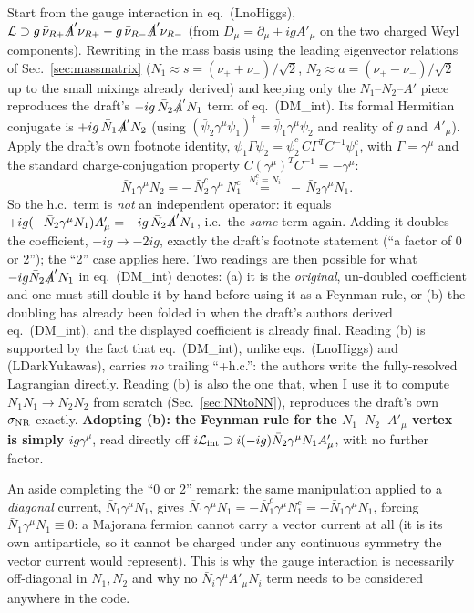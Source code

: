 \documentclass[11pt,a4paper]{article}
\begin{document}
Start from the gauge interaction in eq.~(LnoHiggs),
$\mathcal L\supset g\,\bar\nu_{R+}\slashed A'\nu_{R+}-g\,\bar\nu_{R-}\slashed A'\nu_{R-}$
(from $D_\mu=\partial_\mu\pm ig A'_\mu$ on the two charged Weyl components).
Rewriting in the mass basis using the leading eigenvector relations of
Sec.~\ref{sec:massmatrix} ($N_1\approx s=(\nu_++\nu_-)/\sqrt2$,
$N_2\approx a=(\nu_+-\nu_-)/\sqrt2$ up to the small mixings already derived)
and keeping only the $N_1$--$N_2$--$A'$ piece reproduces the draft's
$-ig\,\bar N_2\slashed A' N_1$ term of eq.~(DM\_int). Its formal Hermitian
conjugate is $+ig\,\bar N_1\slashed A' N_2$ (using
$(\bar\psi_2\gamma^\mu\psi_1)^\dagger=\bar\psi_1\gamma^\mu\psi_2$ and reality
of $g$ and $A'_\mu$). Apply the draft's own footnote identity,
$\bar\psi_1\Gamma\psi_2=\bar\psi_2^c\,C\Gamma^TC^{-1}\psi_1^c$, with
$\Gamma=\gamma^\mu$ and the standard charge-conjugation property
$C(\gamma^\mu)^TC^{-1}=-\gamma^\mu$:
\begin{equation}
  \bar N_1\gamma^\mu N_2 = -\,\bar N_2^c\,\gamma^\mu\,N_1^c
  \;\overset{N_i^c=N_i}{=}\; -\,\bar N_2\gamma^\mu N_1 .
\end{equation}
So the h.c.\ term is \emph{not} an independent operator: it equals
$+ig(-\bar N_2\gamma^\mu N_1)A'_\mu=-ig\,\bar N_2\slashed A' N_1$, i.e.\ the
\emph{same} term again. Adding it doubles the coefficient,
$-ig\to-2ig$, exactly the draft's footnote statement (``a factor of 0 or
2''); the ``2'' case applies here. Two readings are then possible for what
$-ig\bar N_2\slashed A'N_1$ in eq.~(DM\_int) denotes: (a) it is the
\emph{original}, un-doubled coefficient and one must still double it by hand
before using it as a Feynman rule, or (b) the doubling has already been
folded in when the draft's authors derived eq.~(DM\_int), and the displayed
coefficient is already final. Reading (b) is supported by the fact that
eq.~(DM\_int), unlike eqs.~(LnoHiggs) and (LDarkYukawas), carries \emph{no}
trailing ``+h.c.'': the authors write the fully-resolved Lagrangian directly.
Reading (b) is also the one that, when I use it to compute
$N_1N_1\to N_2N_2$ from scratch (Sec.~\ref{sec:NNtoNN}), reproduces the
draft's own $\sigma_{\rm NR}$ exactly. \textbf{Adopting (b): the Feynman rule
for the $N_1$--$N_2$--$A'_\mu$ vertex is simply $ig\gamma^\mu$}, read directly
off $i\mathcal L_{\rm int}\supset i(-ig)\bar N_2\gamma^\mu N_1A'_\mu$, with no
further factor.

An aside completing the ``0 or 2'' remark: the same manipulation applied to
a \emph{diagonal} current, $\bar N_1\gamma^\mu N_1$, gives
$\bar N_1\gamma^\mu N_1=-\bar N_1^c\gamma^\mu N_1^c=-\bar N_1\gamma^\mu N_1$,
forcing $\bar N_1\gamma^\mu N_1\equiv0$: a Majorana fermion cannot carry a
vector current at all (it is its own antiparticle, so it cannot be charged
under any continuous symmetry the vector current would represent). This is
why the gauge interaction is necessarily off-diagonal in $N_1,N_2$ and why no
$\bar N_i\gamma^\mu A'_\mu N_i$ term needs to be considered anywhere in the
code.
\end{document}
